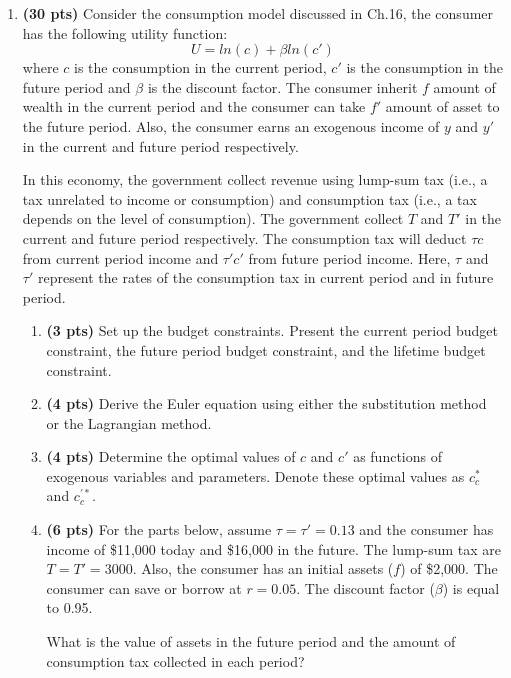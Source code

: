 \documentclass[14pt, oneside]{memoir}
\begin{document}
\begin{enumerate}[label=\textbf{\arabic*.}, itemsep=15pt]

\item \textbf{(30  pts)}\label{P1}  Consider the consumption model discussed in Ch.16, the consumer has the following utility function:
\[U = ln(c) + \beta ln(c')\]
where $c$ is the consumption in the current period, $c'$ is the consumption in the future period and $\beta$ is the discount factor. The consumer inherit $f$ amount of wealth in the current period and the consumer can take $f'$ amount of asset to the future period. Also, the consumer earns an exogenous income of $y$ and $y'$ in the current and future period respectively.

In this economy, the government collect revenue using lump-sum tax (i.e., a tax unrelated to income or consumption) and consumption tax (i.e., a tax depends on the level of consumption). The government collect $T$ and $T'$ in the current and future period respectively. The consumption tax will deduct $\tau c$ from current period income and $\tau' c'$ from future period income. Here, $\tau$ and $\tau'$ represent the rates of the consumption tax in current period and in future period.

\begin{enumerate}[label=(\alph*)]
	\item \textbf{(3 pts)} Set up the budget constraints. Present the current period budget constraint, the future period budget constraint, and the lifetime budget constraint.
	
	
	
	\item \textbf{(4 pts)} Derive the Euler equation using either the substitution method or the Lagrangian method.
	

	\item \textbf{(4 pts)} Determine the optimal values of \( c \) and \( c' \) as functions of exogenous variables and parameters. Denote these optimal values as \( c_c^* \) and \( c_c^{'*} \).
	

	\item \textbf{(6 pts)} For the parts below, assume \( \tau = \tau' = 0.13 \) and the consumer has income of \$11,000 today and \$16,000 in the future. The lump-sum tax are $T=T'=3000$. Also, the consumer has an initial assets ($f$) of \$2,000. The consumer can save or borrow at $r= 0.05$. The discount factor ($\beta$) is equal to 0.95. 
	
	What is the value of assets in the future period and the amount of consumption tax collected in each period?
	

\end{enumerate}
\end{enumerate}
\end{document}
